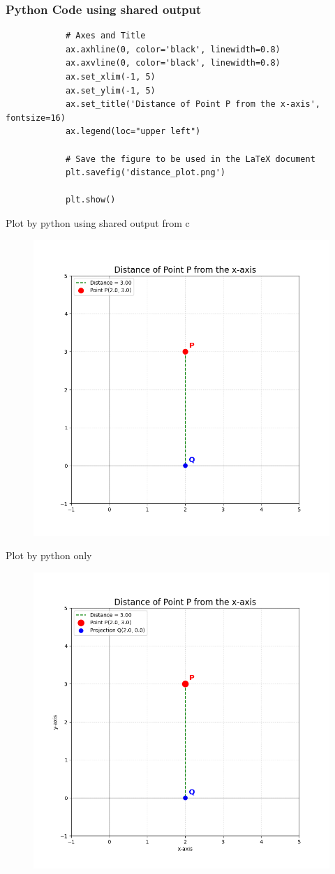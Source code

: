 \documentclass{beamer}
\begin{document}
	\begin{frame}[fragile]
		\frametitle{Python Code using shared output}
		\begin{lstlisting}
			# Axes and Title
			ax.axhline(0, color='black', linewidth=0.8)
			ax.axvline(0, color='black', linewidth=0.8)
			ax.set_xlim(-1, 5)
			ax.set_ylim(-1, 5)
			ax.set_title('Distance of Point P from the x-axis', fontsize=16)
			ax.legend(loc="upper left")
			
			# Save the figure to be used in the LaTeX document
			plt.savefig('distance_plot.png')
			
			plt.show()
		\end{lstlisting}
	\end{frame}
	

	\begin{frame}{Plot by python using shared output from c}
		\begin{center}
			\begin{figure}[H]
				\centering
				\includegraphics[width = 0.6\columnwidth]{figs/Figure_1.png}
				\caption*{}
				\label{}
			\end{figure}
		\end{center}
	\end{frame}
	\begin{frame}{Plot by python only}
		\begin{center}
			\begin{figure}[H]
				\centering
				\includegraphics[width = 0.6\columnwidth]{figs/Figure_2.png}
				\caption*{}
				\label{}
			\end{figure}
			
		\end{center}
	\end{frame}
	
\end{document}
